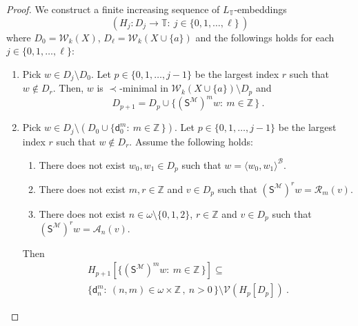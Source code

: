 \documentclass[10pt,a4paper, openany,  oldfontcommands]{memoir}
\newtheorem{open problem} [theorem] {Open Problem}
\newtheorem{open question} [theorem] {Open Question}
\renewcommand{\mathrm}{\mathsf}
\begin{document}
\begin{proof}



We construct a finite  increasing sequence    of   $  L_{  \mathbb{T} }$-embeddings 
\[
\left(  H_j  :  D_j  \to  \mathbb{T}  :   \    j  \in  \lbrace 0, 1  ,  \ldots ,   \ell  \rbrace   \,    \right)
\]
where  $  D_0  =    \mathcal{W}_{ k }  \left(  X  \right)     $, 
$ D_{  \ell  }  =   \mathcal{W}_{  k  }  \left(  X  \cup  \lbrace a  \rbrace  \right) $
and   the followings holds   for each    $   j  \in  \lbrace 0, 1  ,  \ldots ,   \ell  \rbrace   $: 
\begin{enumerate}

\item  Pick   $  w  \in    D_j   \setminus   D_0  $. 
 Let   $  p  \in     \lbrace 0, 1  ,  \ldots ,   j-1   \rbrace  $  be the largest index  $r$ such that  $  w  \not\in  D_r  $. 
 Then,  $  w  $  is  $  \prec  $-minimal in   $   \mathcal{W}_{  k  }  \left(  X  \cup  \lbrace a  \rbrace  \right)   \setminus  D_p  $
 and 
 \[
 D_{ p+1}  =  D_p  \cup
 \big\{     \left(  \mathrm{S}^{  \mathcal{M}  }  \right)^m   w :   \   m   \in  \mathbb{Z}    \,  \big\}   
   \        .
 \]







\item  Pick   $  w  \in    D_j   \setminus   \left( D_0  \cup   \lbrace  \mathsf{d}^m_0  :   \   m   \in  \mathbb{Z}  \,   \rbrace    \right)   $.   
 Let   $  p  \in     \lbrace 0, 1  ,  \ldots ,   j-1   \rbrace  $  be the largest index  $r$ such that  $  w  \not\in  D_r  $. 
Assume  the following holds: 
\begin{enumerate}
\item There does not exist  $  w_0, w_1  \in D_{p}  $  such that  $  w  =  \langle w_0, w_1  \rangle^{  \mathcal{B}  }   $.


\item     There does   not exist  $  m, r  \in  \mathbb{Z}  $  and  $  v  \in  D_{p}   $  such that 
 $  \left(  \mathrm{S}^{  \mathcal{M}  }  \right)^r   w = \mathcal{R}_m  \left( v  \right)  $.

  \item     There   does   not exist  $  n  \in  \omega  \setminus  \lbrace 0, 1, 2  \rbrace $,  $  r  \in  \mathbb{Z} $   and  $  v  \in  D_{p}  $  such that  
  $  \left(  \mathrm{S}^{  \mathcal{M}  }  \right)^r    w   = \mathcal{A}_n  \left( v  \right)  $.
\end{enumerate}
Then
\begin{multline*}
  H_{p+1}   \left[     \big\{     \left(  \mathrm{S}^{  \mathcal{M}  }  \right)^m   w :   \   m   \in  \mathbb{Z}    \,  \big\}     \right] 
\subseteq 
\\
   \big\{    \mathsf{d}^m_n  :   \   (n, m )  \in  \omega  \times  \mathbb{Z}   \, ,   \  n>0   \,   \big\}       \setminus 
\mathcal{V}     \left(   H_{ p}  \left[  D_{p}   \right]   \right)      
\        .
\end{multline*}




\end{enumerate}
\end{proof}
\end{document}
